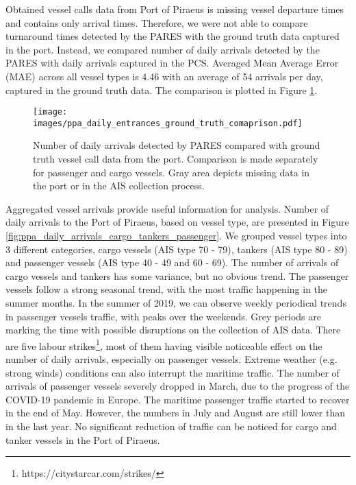 \documentclass[conference]{IEEEtran}
\begin{document}
Obtained vessel calls data from Port of Piraeus is missing vessel departure times and contains only arrival times. Therefore, we were not able to compare turnaround times detected by the PARES with the ground truth data captured in the port. Instead, we compared number of daily arrivals detected by the PARES with daily arrivals captured in the PCS. Averaged Mean Average Error (MAE) across all vessel types is 4.46 with an average of 54 arrivals per day, captured in the ground truth data. The comparison is plotted in Figure \ref{fig:ppa_daily_entrances_ground_truth_comaprison}.

\begin{figure}[ht!]
    \centering
    \texttt{[image: images/ppa\_daily\_entrances\_ground\_truth\_comaprison.pdf]}
    \caption{Number of daily arrivals detected by PARES compared with ground truth vessel call data from the port. Comparison is made separately for passenger and cargo vessels. Gray area depicts missing data in the port or in the AIS collection process.}\label{fig:ppa_daily_entrances_ground_truth_comaprison}
\end{figure}


Aggregated vessel arrivals provide useful information for analysis. Number of daily arrivals to the Port of Piraeus, based on vessel type, are presented in Figure \ref{fig:ppa_daily_arrivals_cargo_tankers_passenger}. We grouped vessel types into 3 different categories, cargo vessels (AIS type 70 - 79), tankers (AIS type 80 - 89) and passenger vessels (AIS type 40 - 49 and 60 - 69). The number of arrivals of cargo vessels and tankers has some variance, but no obvious trend. The passenger vessels follow a strong seasonal trend, with the most traffic happening in the summer months. In the summer of 2019, we can observe weekly periodical trends in passenger vessels traffic, with peaks over the weekends. Grey periods are marking the time with possible disruptions on the collection of AIS data. There are five labour strikes\footnote{https://citystarcar.com/strikes/}, most of them having visible noticeable effect on the number of daily arrivals, especially on passenger vessels. Extreme weather (e.g. strong winds) conditions can also interrupt the maritime traffic. The number of arrivals of passenger vessels severely dropped in March, due to the progress of the COVID-19 pandemic in Europe. The maritime passenger traffic started to recover in the end of May. However, the numbers in July and August are still lower than in the last year. No significant reduction of traffic can be noticed for cargo and tanker vessels in the Port of Piraeus.
\end{document}
